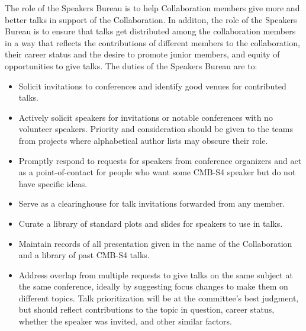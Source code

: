 \documentclass[12pt]{article}
\begin{document}
The role of the Speakers Bureau is to help Collaboration members give more and better talks in support of the Collaboration. In additon, the role of the Speakers Bureau is to ensure that talks get distributed among the collaboration members in a way that reflects the contributions of different members to the collaboration, their career status and the desire to promote junior members, and equity of opportunities to give talks. The duties of the Speakers Bureau are to:
\begin{itemize}
\item Solicit invitations to conferences and identify good venues for contributed talks.
\item Actively solicit speakers for invitations or notable conferences with no volunteer speakers. Priority and consideration should be given to the teams from projects where alphabetical author lists may obscure their role. 
\item Promptly respond to requests for speakers from conference organizers and act as a point-of-contact for people who want some CMB-S4 speaker but do not have specific ideas.
\item {\color{red} Serve as a clearinghouse for talk invitations forwarded from any member.}
\item Curate a library of standard plots and slides for speakers to use in talks.
\item {\color{red}Maintain records of all presentation given in the name of the Collaboration} and a library of past CMB-S4 talks.
\item Address overlap from multiple requests to give talks on the same subject at the same conference, ideally by suggesting focus changes to make them on different topics. Talk prioritization will be at the committee's best judgment, but should reflect contributions to the topic in question, career status, whether the speaker was invited, and other similar factors.
\end{itemize}
\end{document}
